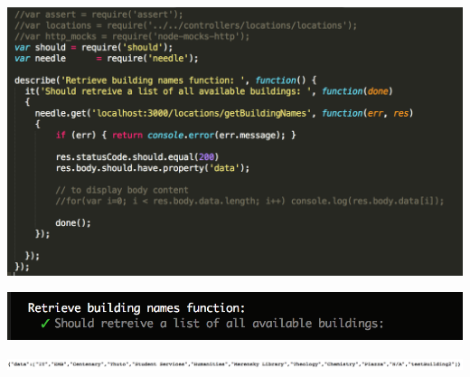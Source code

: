 \documentclass[runningheads,a4paper]{article}
\begin{document}
	\begin{center}
		\begin{minipage}{0.48\linewidth}
			\includegraphics[width=\linewidth]{fig/buildingSearch.png}
		\end{minipage}
		\hfill
		\begin{minipage}{0.49\linewidth}
			\includegraphics[width=\linewidth]{fig/ReqBuildAll.png}
		\end{minipage}
	\hfill
		\begin{minipage}{1.0\linewidth}
			\includegraphics[width=\linewidth]{fig/buildalldata.png}
		\end{minipage}
	\hfill
	\end{center}
	
	
	
	
\end{document}
